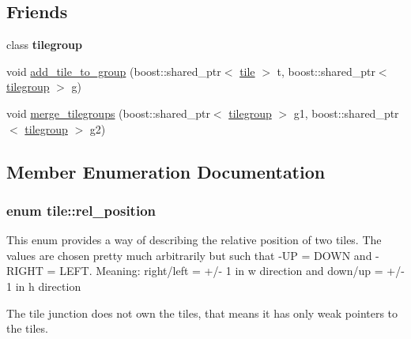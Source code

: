 \subsection*{Friends}
\begin{DoxyCompactItemize}
\item 
\hypertarget{classtile_a2fa7ac0b19bb84e1e68b73be2631ac2f}{class {\bfseries tilegroup}}\label{classtile_a2fa7ac0b19bb84e1e68b73be2631ac2f}

\item 
void \hyperlink{classtile_ad9d048f39dc13c36b83a87295fdf75f9}{add\-\_\-tile\-\_\-to\-\_\-group} (boost\-::shared\-\_\-ptr$<$ \hyperlink{classtile}{tile} $>$ t, boost\-::shared\-\_\-ptr$<$ \hyperlink{classtilegroup}{tilegroup} $>$ g)
\item 
void \hyperlink{classtile_afba0cc66139bf69ca850987161757cd2}{merge\-\_\-tilegroups} (boost\-::shared\-\_\-ptr$<$ \hyperlink{classtilegroup}{tilegroup} $>$ g1, boost\-::shared\-\_\-ptr$<$ \hyperlink{classtilegroup}{tilegroup} $>$ g2)
\end{DoxyCompactItemize}


\subsection{Member Enumeration Documentation}
\hypertarget{classtile_a637de74fd50d4b3583b657caa4bf0301}{
\subsubsection[{rel\-\_\-position}]{\setlength{\rightskip}{0pt plus 5cm}enum {\bf tile\-::rel\-\_\-position}}}\label{classtile_a637de74fd50d4b3583b657caa4bf0301}
This enum provides a way of describing the relative position of two tiles. The values are chosen pretty much arbitrarily but such that -\/\-U\-P = D\-O\-W\-N and -\/\-R\-I\-G\-H\-T = L\-E\-F\-T. Meaning\-: right/left = +/-\/ 1 in w direction and down/up = +/-\/ 1 in h direction

The tile junction does not own the tiles, that means it has only weak pointers to the tiles. 

